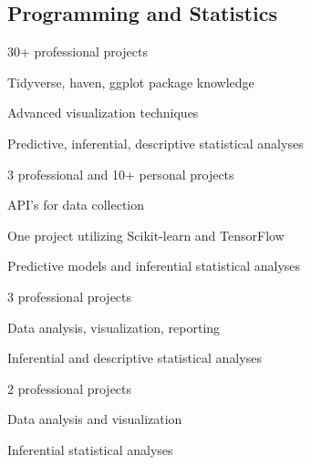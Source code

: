 \subsection{Programming and Statistics}
    \begin{cvtable}
            {\color{cvsectioncolor}{R}}
            {}
            {\begin{tightitemize}
                \item 30+ professional projects 
                \item Tidyverse, haven, ggplot package knowledge
                \item Advanced visualization techniques
                \item Predictive, inferential, descriptive statistical analyses
            \end{tightitemize}}
            {\color{cvsectioncolor}{Python}}
            {}
            {\begin{tightitemize}
                \item 3 professional and 10+ personal projects 
                \item API's for data collection
                \item One project utilizing Scikit-learn and TensorFlow
                \item Predictive models and inferential statistical analyses 
            \end{tightitemize}}
        \cvitem{}
            {\color{cvsectioncolor}{JMP}}
            {}
            {\begin{tightitemize}
                \item 3 professional projects
                \item Data analysis, visualization, reporting
                \item Inferential and descriptive statistical analyses
            \end{tightitemize}}
        \cvitem{}
            {\color{cvsectioncolor}{SPSS}}
            {}
            {\begin{tightitemize}
                \item 2 professional projects
                \item Data analysis and visualization
                \item Inferential statistical analyses
            \end{tightitemize}}
    \end{cvtable}

